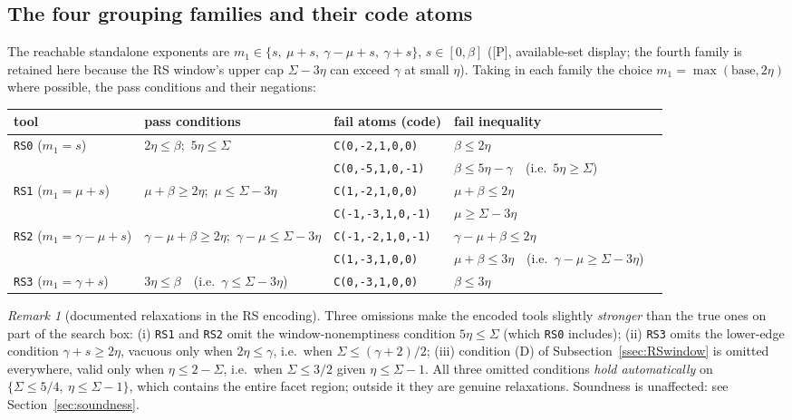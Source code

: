 \documentclass[11pt]{article}
\theoremstyle{remark}
\newtheorem{remark}[lemma]{Remark}
\newcommand{\code}[1]{\texttt{#1}}
\begin{document}
\subsection{The four grouping families and their code atoms}
The reachable standalone exponents are
$m_1\in\{s,\ \mu+s,\ \gamma-\mu+s,\ \gamma+s\}$, $s\in[0,\beta]$
([P], available-set display; the fourth family is retained here because
the RS window's upper cap $\Sigma-3\eta$ can exceed $\gamma$ at small
$\eta$). Taking in each family the choice $m_1=\max(\text{base},2\eta)$
where possible, the pass conditions and their negations:

\begin{center}
\small
\begin{tabular}{@{}lllll@{}}
\toprule
tool & pass conditions & fail atoms (code) & fail inequality\\
\midrule
\code{RS0} ($m_1=s$) & $2\eta\le\beta$;\ $5\eta\le\Sigma$
 & \code{C(0,-2,1,0,0)} & $\beta\le2\eta$\\
 & & \code{C(0,-5,1,0,-1)} & $\beta\le5\eta-\gamma$\ \ (i.e.\ $5\eta\ge\Sigma$)\\
\code{RS1} ($m_1=\mu+s$) & $\mu+\beta\ge2\eta$;\ $\mu\le\Sigma-3\eta$
 & \code{C(1,-2,1,0,0)} & $\mu+\beta\le2\eta$\\
 & & \code{C(-1,-3,1,0,-1)} & $\mu\ge\Sigma-3\eta$\\
\code{RS2} ($m_1=\gamma-\mu+s$) & $\gamma-\mu+\beta\ge2\eta$;\ $\gamma-\mu\le\Sigma-3\eta$
 & \code{C(-1,-2,1,0,-1)} & $\gamma-\mu+\beta\le2\eta$\\
 & & \code{C(1,-3,1,0,0)} & $\mu+\beta\le3\eta$\ \ (i.e.\ $\gamma-\mu\ge\Sigma-3\eta$)\\
\code{RS3} ($m_1=\gamma+s$) & $3\eta\le\beta$\ \ (i.e.\ $\gamma\le\Sigma-3\eta$)
 & \code{C(0,-3,1,0,0)} & $\beta\le3\eta$\\
\bottomrule
\end{tabular}
\end{center}

\begin{remark}[documented relaxations in the RS encoding]
\label{rem:relaxations}
Three omissions make the encoded tools slightly \emph{stronger} than the
true ones on part of the search box:
(i) \code{RS1} and \code{RS2} omit the window-nonemptiness condition
$5\eta\le\Sigma$ (which \code{RS0} includes);
(ii) \code{RS3} omits the lower-edge condition $\gamma+s\ge2\eta$, vacuous
only when $2\eta\le\gamma$, i.e.\ when $\Sigma\le(\gamma+2)/2$;
(iii) condition (D) of Subsection~\ref{ssec:RSwindow} is omitted
everywhere, valid only when $\eta\le2-\Sigma$, i.e.\ when
$\Sigma\le3/2$ given $\eta\le\Sigma-1$.
All three omitted conditions \emph{hold automatically} on
$\{\Sigma\le5/4,\ \eta\le\Sigma-1\}$, which contains the entire facet
region; outside it they are genuine relaxations. Soundness is unaffected:
see Section~\ref{sec:soundness}.
\end{remark}
\end{document}
